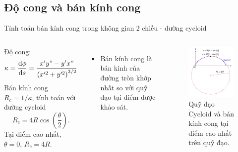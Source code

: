\subsection{Độ cong và bán kính cong}

\begin{frame}{Tính toán bán kính cong trong không gian 2 chiều - đường cycloid}
    \begin{columns}
            Độ cong:
            \begin{equation}
                \kappa = \dfrac{\mathrm{d} \phi}{\mathrm{d} s} = \frac{x' y" - y' x"}{\left( x'^2 + y'^2 \right)^{3/2}}
            \end{equation}
            Bán kính cong \(R_c = 1/\kappa\), tính toán với đường cycloid
            \begin{equation}
                R_c = 4 R \cos \left( \dfrac{\theta}{2} \right).
            \end{equation}
            Tại điểm cao nhất, \(\theta=0\), \(R_c=4R\).
            \begin{itemize}
                \item Bán kính cong là bán kính của đường tròn khớp nhất so với quỹ đạo tại điểm được khảo sát. \cite{BoiDuoongHSGTHPT_Phantich}
            \end{itemize}
        \vspace{-7mm}
        \begin{figure}
            \centering
            \includegraphics[width=0.9\linewidth]{Figures/Cycloid.pdf}
            \caption{Quỹ đạo Cycloid và bán kính cong tại điểm cao nhất trên quỹ đạo.}
            \label{fig:Cycloid}
        \end{figure}
    \end{columns}
\end{frame}

